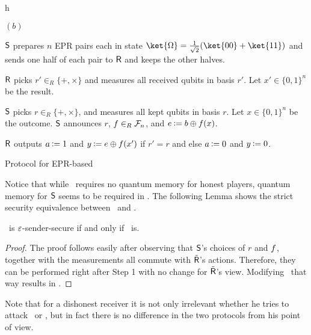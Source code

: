 \begin{myfigure}{h}
\begin{myprotocol}{\eprqot$(b)$}
\item ${\sf S}$ prepares $n$ EPR pairs each in state
  $\ket{\Omega}=\frac{1}{\sqrt{2}}(\ket{00}+\ket{11})$ and sends one
  half of each pair to ${\sf R}$ and keeps the other halves.\label{rec}
\item ${\sf R}$ picks $r'\in_R\{+,\times \}$ and measures all received qubits
      in basis $r'$. Let $x'\in\{0,1\}^n$ be the result.
\item ${\sf S}$ picks $r\in_R\{+,\times \}$, and measures all kept
      qubits in basis $r$. Let $x\in\{0,1\}^n$ be the outcome.  ${\sf S}$
      announces $r$, $f\in_R \mathcal{F}_{n}$, and $e \assign b\oplus \hf(x)$.\label{it:measure}
\item ${\sf R}$ outputs $a \assign 1$ and $y \assign e \oplus \hf(x')$ if $r'=r$ and else $a \assign 0$ and $y \assign 0$.
\end{myprotocol}
\caption{Protocol for EPR-based \RabinOT}\label{fig:eprot}
\end{myfigure}

Notice that while \qot\ requires no quantum memory for honest players,
quantum memory for ${\sf S}$ seems to be required in \eprqot. The following
Lemma shows the strict security equivalence between \qot\ and \eprqot.

\begin{lemma}\label{lem:seqequiv}
  \qot\ is $\varepsilon$-sender-secure if and only if \eprqot\ is.
\end{lemma}
\begin{proof}
The proof follows easily after observing that ${\sf S}$'s
choices of $r$ and $f$, together with 
the measurements all commute with $\tilde{\sf R}$'s actions.
Therefore, they can be performed right after Step 1
with no change for $\tilde{\sf R}$'s view. Modifying \eprqot\
that way results in \qot.
\end{proof}

Note that for a dishonest receiver it is not only irrelevant whether he tries to attack \qot\ or \eprqot, but in fact there is no difference in the two protocols from his point of view. 

